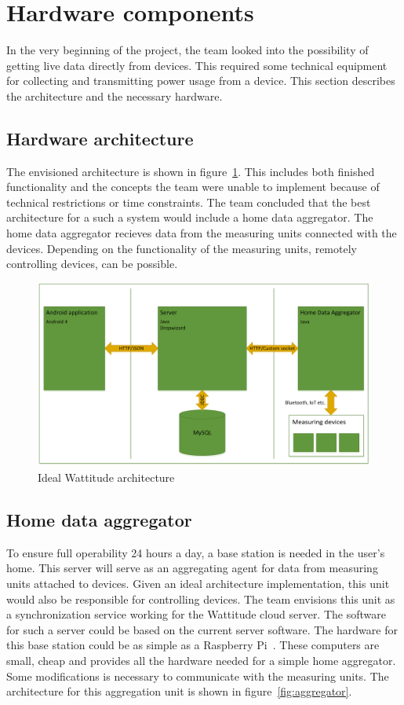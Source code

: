 \section{Hardware components}
\label{sec:hardwareComponents}
In the very beginning of the project, the team looked into the possibility of getting live data directly from devices. This required some technical equipment for collecting and transmitting power usage from a device. This section describes the architecture and the necessary hardware.

\subsection{Hardware architecture}

The envisioned architecture is shown in figure~\ref{fig:idealArchitecture}. This includes both finished functionality and the concepts the team were unable to implement because of technical restrictions or time constraints. The team concluded that the best architecture for a such a system would include a home data aggregator. The home data aggregator recieves data from the measuring units connected with the devices. Depending on the functionality of the measuring units, remotely controlling devices, can be possible.

\begin{figure}[H]
\centering
\includegraphics[width=\textwidth]{ch/further/fig/architecture.png}
\caption{Ideal Wattitude architecture}
\label{fig:idealArchitecture}
\end{figure}


\subsection{Home data aggregator}
To ensure full operability 24 hours a day, a base station is needed in the user's home. This server will serve as an aggregating agent for data from measuring units attached to devices. Given an ideal architecture implementation, this unit would also be responsible for controlling devices. The team envisions this unit as a synchronization service working for the Wattitude cloud server. The software for such a server could be based on the current server software. The hardware for this base station could be as simple as a Raspberry Pi~\cite{pi}. These computers are small, cheap and provides all the hardware needed for a simple home aggregator. Some modifications is necessary to communicate with the measuring units. The architecture for this aggregation unit is shown in figure~\ref{fig:aggregator}.

